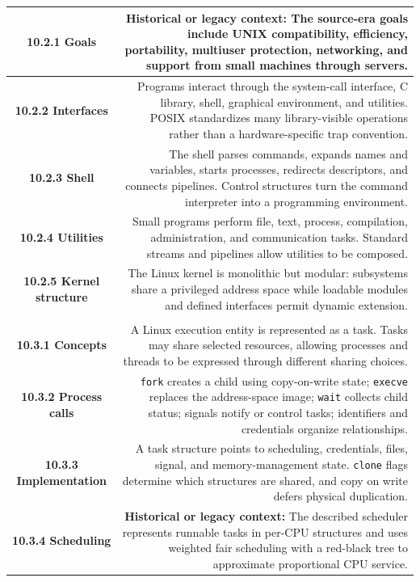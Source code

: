 \documentclass[10pt,letterpaper]{article}
\begin{document}
\begin{longtable}{C N}
\textbf{10.2.1 Goals} & \textcolor{legacy}{\textbf{Historical or legacy context:}} The source-era goals include UNIX compatibility, efficiency, portability, multiuser protection, networking, and support from small machines through servers.\\\hline
\textbf{10.2.2 Interfaces} & Programs interact through the system-call interface, C library, shell, graphical environment, and utilities. POSIX standardizes many library-visible operations rather than a hardware-specific trap convention.\\\hline
\textbf{10.2.3 Shell} & The shell parses commands, expands names and variables, starts processes, redirects descriptors, and connects pipelines. Control structures turn the command interpreter into a programming environment.\\\hline
\textbf{10.2.4 Utilities} & Small programs perform file, text, process, compilation, administration, and communication tasks. Standard streams and pipelines allow utilities to be composed.\\\hline
\textbf{10.2.5 Kernel structure} & The Linux kernel is monolithic but modular: subsystems share a privileged address space while loadable modules and defined interfaces permit dynamic extension.\\\hline
{}\\*\hline
\textbf{10.3.1 Concepts} & A Linux execution entity is represented as a task. Tasks may share selected resources, allowing processes and threads to be expressed through different sharing choices.\\\hline
\textbf{10.3.2 Process calls} & \texttt{fork} creates a child using copy-on-write state; \texttt{execve} replaces the address-space image; \texttt{wait} collects child status; signals notify or control tasks; identifiers and credentials organize relationships.\\\hline
\textbf{10.3.3 Implementation} & A task structure points to scheduling, credentials, files, signal, and memory-management state. \texttt{clone} flags determine which structures are shared, and copy on write defers physical duplication.\\\hline
\textbf{10.3.4 Scheduling} & \textcolor{legacy}{\textbf{Historical or legacy context:}} The described scheduler represents runnable tasks in per-CPU structures and uses weighted fair scheduling with a red-black tree to approximate proportional CPU service.\\\hline

\end{longtable}
\end{document}
